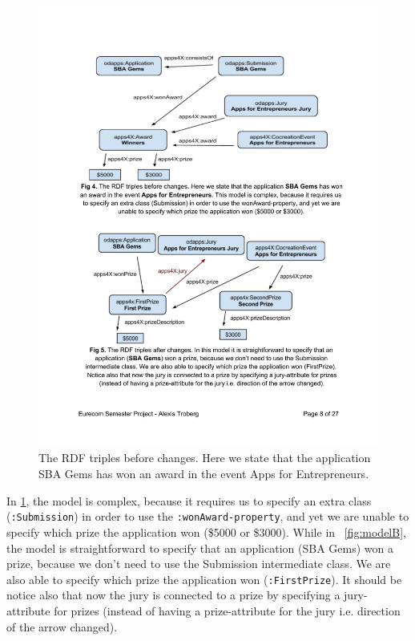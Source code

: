 \begin{figure}[!htbp]

\includegraphics[scale=.8]{img/rdfTriplesBeforeChanges.pdf}
\caption{The RDF triples before changes. Here we state that the application SBA Gems has won an award in the event Apps for Entrepreneurs. }
\label{fig:modelA}
\end{figure}

In \ref{fig:modelA}, the model is complex, because it requires us to specify an extra class (\texttt{:Submission}) in order to use the \texttt{:wonAward-property}, and yet we are unable to specify which prize the application won (\$5000 or \$3000). While in ~\ref{fig:modelB}, the model is straightforward to specify that an application (SBA Gems) won a prize, because we don't need to use the Submission intermediate class. We are also able to specify which prize the application won (\texttt{:FirstPrize}). It should be notice  also that now the jury is connected to a prize by specifying a jury-attribute for prizes (instead of having a prize-attribute for the jury i.e. direction of the arrow changed).

